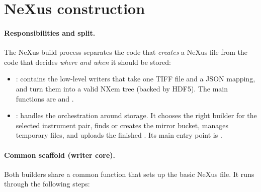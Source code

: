 
\section{NeXus construction}\label{sec:nexus-construction}

\paragraph{Responsibilities and split.}
The NeXus build process separates the code that \emph{creates} a NeXus file 
from the code that decides \emph{where and when} it should be stored:

\begin{itemize}
	\item {}: contains the low-level writers that take one TIFF file and a JSON mapping, 
	and turn them into a valid NXem tree (backed by HDF5). 
	The main functions are  and .
	
	\item {}: handles the orchestration around storage. 
	It chooses the right builder for the selected instrument pair, finds or creates the mirror bucket, 
	manages temporary files, and uploads the finished . 
	Its main entry point is .
\end{itemize}

\paragraph{Common scaffold (writer core).}
Both builders share a common function  that sets up the basic NeXus file. 
It runs through the following steps:

